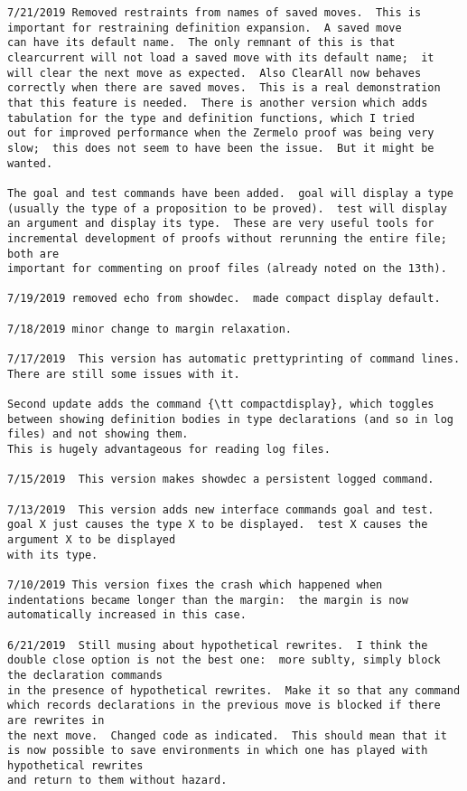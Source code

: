 \documentclass{article}
\begin{document}
{\begin{verbatim}
7/21/2019 Removed restraints from names of saved moves.  This is important for restraining definition expansion.  A saved move
can have its default name.  The only remnant of this is that clearcurrent will not load a saved move with its default name;  it
will clear the next move as expected.  Also ClearAll now behaves correctly when there are saved moves.  This is a real demonstration
that this feature is needed.  There is another version which adds tabulation for the type and definition functions, which I tried
out for improved performance when the Zermelo proof was being very slow;  this does not seem to have been the issue.  But it might be wanted.

The goal and test commands have been added.  goal will display a type (usually the type of a proposition to be proved).  test will display
an argument and display its type.  These are very useful tools for incremental development of proofs without rerunning the entire file;  both are
important for commenting on proof files (already noted on the 13th).

7/19/2019 removed echo from showdec.  made compact display default.

7/18/2019 minor change to margin relaxation.

7/17/2019  This version has automatic prettyprinting of command lines.  There are still some issues with it.

Second update adds the command {\tt compactdisplay}, which toggles between showing definition bodies in type declarations (and so in log files) and not showing them.
This is hugely advantageous for reading log files.

7/15/2019  This version makes showdec a persistent logged command.

7/13/2019  This version adds new interface commands goal and test.  goal X just causes the type X to be displayed.  test X causes the argument X to be displayed
with its type.

7/10/2019 This version fixes the crash which happened when indentations became longer than the margin:  the margin is now automatically increased in this case.

6/21/2019  Still musing about hypothetical rewrites.  I think the double close option is not the best one:  more sublty, simply block the declaration commands
in the presence of hypothetical rewrites.  Make it so that any command which records declarations in the previous move is blocked if there are rewrites in
the next move.  Changed code as indicated.  This should mean that it is now possible to save environments in which one has played with hypothetical rewrites
and return to them without hazard.


\end{verbatim}}
\end{document}
